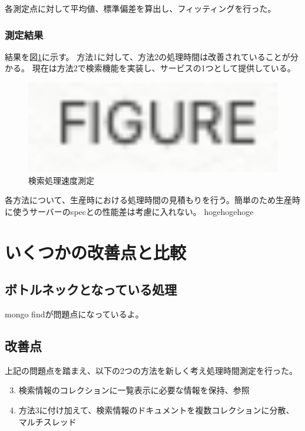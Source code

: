 各測定点に対して平均値、標準偏差を算出し、フィッティングを行った。


\subsubsection{測定結果}

結果を図\ref{searching_time}に示す。
方法1に対して、方法2の処理時間は改善されていることが分かる。
現在は方法2で検索機能を実装し、サービスの1つとして提供している。

\begin{figure}[bpt]
  \begin{center}
    \includegraphics[width=16cm]{figure}
  \caption[検索処理速度測定]{検索処理速度測定}
  \label{searching_time}
  \end{center}
\end{figure}

各方法について、生産時における処理時間の見積もりを行う。簡単のため生産時に使うサーバーのspecとの性能差は考慮に入れない。
hogehogehoge
 
\section{いくつかの改善点と比較}
\subsection{ボトルネックとなっている処理}
mongo findが問題点になっているよ。

\subsection{改善点}
上記の問題点を踏まえ、以下の2つの方法を新しく考え処理時間測定を行った。

\begin{enumerate}
  \setcounter{enumi}{2}
  \item 検索情報のコレクションに一覧表示に必要な情報を保持、参照 
  \item 方法3に付け加えて、検索情報のドキュメントを複数コレクションに分散、マルチスレッド
\end{enumerate}

